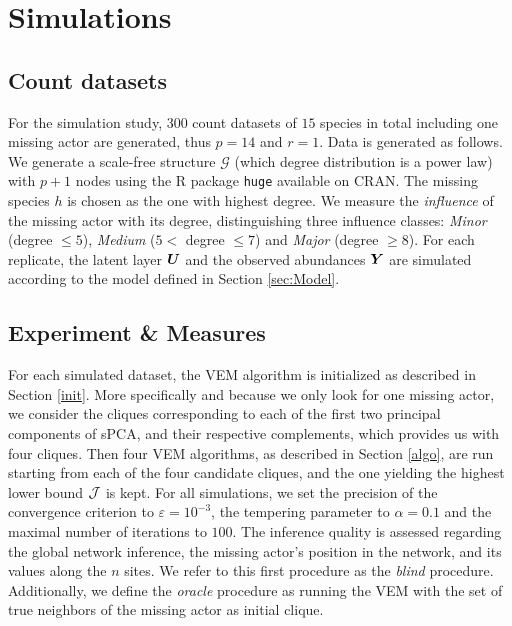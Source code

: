 \section{Simulations} \label{sec:Simul}
\subsection{Count datasets}
For the simulation study, 300 count datasets of $15$ species in total including one missing actor are generated, thus $p=14$ and $r=1$. 
Data is generated as follows.
We generate a scale-free structure $\mathcal{G}$ (which degree distribution is a power law) with $p+1$ nodes using the R package \texttt{huge} \citep{zhao2012huge} available on CRAN. 
The missing species $h$ is chosen as the one with highest degree. We measure the {\sl influence} of the missing actor with its degree, distinguishing three influence classes: \textit{Minor} (degree $\leq 5$), \textit{Medium} ($5<$ degree $\leq 7$) and \textit{Major} (degree $\geq 8$). For each replicate, the latent layer ${\boldsymbol{U}}$ and the observed abundances ${\boldsymbol{Y}}$ are simulated according to the model defined in Section \ref{sec:Model}.


\subsection{Experiment \& Measures}
For each simulated dataset, the VEM algorithm is initialized as described in Section \ref{init}. 
More specifically and because we only look for one missing actor, we consider the cliques corresponding to each of the first two principal components of sPCA, and their respective complements, which provides us with four cliques.
Then four VEM algorithms, as described in Section \ref{algo}, are run starting from each of the four candidate cliques, and the one yielding the highest lower bound ${\mathcal{J}}$ is kept. 
For all simulations, we set the precision of the convergence criterion to $\varepsilon=10^{-3}$, the tempering parameter to $\alpha=0.1$ and the maximal number of iterations to $100$. 
The  inference quality is assessed regarding the global network inference, the missing actor's position in the network, and its values along the $n$ sites. We refer to this first procedure as the \textit{blind} procedure. Additionally, we define the \textit{oracle} procedure as running the VEM with the set of true neighbors of the missing actor as initial clique.\\

